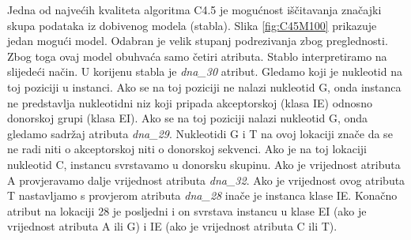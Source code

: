 Jedna od najvećih kvaliteta algoritma C4.5 je mogućnost iščitavanja značajki skupa podataka iz dobivenog modela (stabla). Slika \ref{fig:C45M100} prikazuje jedan mogući model. Odabran je velik stupanj podrezivanja zbog preglednosti. Zbog toga ovaj model obuhvaća samo četiri atributa. Stablo interpretiramo na slijedeći način. U korijenu stabla je \textit{dna{\_}30} atribut. Gledamo koji je nukleotid na toj poziciji u instanci. Ako se na toj poziciji ne nalazi nukleotid G, onda instanca ne predstavlja nukleotidni niz koji pripada akceptorskoj (klasa IE) odnosno donorskoj grupi (klasa EI). Ako se na toj poziciji nalazi nukleotid G, onda gledamo sadržaj atributa \textit{dna{\_}29}. Nukleotidi G i T na ovoj lokaciji znače da se ne radi niti o akceptorskoj niti o donorskoj sekvenci. Ako je na toj lokaciji nukleotid C, instancu svrstavamo u donorsku skupinu. Ako je vrijednost atributa A provjeravamo dalje vrijednost atributa \textit{dna{\_}32}. Ako je vrijednost ovog atributa T nastavljamo s provjerom atributa \textit{dna{\_}28} inače je instanca klase IE. Konačno atribut na lokaciji 28 je posljedni i on svrstava instancu u klase EI (ako je vrijednost atributa A ili G) i IE (ako je vrijednost atributa C ili T).

